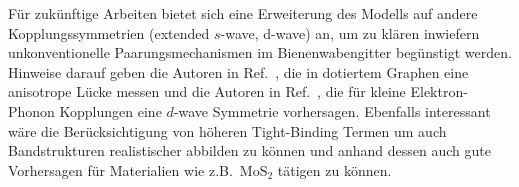 Für zukünftige Arbeiten bietet sich eine Erweiterung des Modells auf andere Kopplungssymmetrien (extended $s$-wave, d-wave) an, um zu klären inwiefern unkonventionelle Paarungsmechanismen im Bienenwabengitter begünstigt werden. 
Hinweise darauf geben die Autoren in Ref.~\cite{ludbrook_evidence_2015}, die in dotiertem Graphen eine anisotrope Lücke messen und die Autoren in Ref.~\cite{herrera_topological_2024}, die für kleine Elektron-Phonon Kopplungen eine $d$-wave Symmetrie vorhersagen.
Ebenfalls interessant wäre die Berücksichtigung von höheren Tight-Binding Termen um auch Bandstrukturen realistischer abbilden zu können und anhand dessen auch gute Vorhersagen für Materialien wie z.B.\ $\mathrm{MoS_2}$ tätigen zu können.
